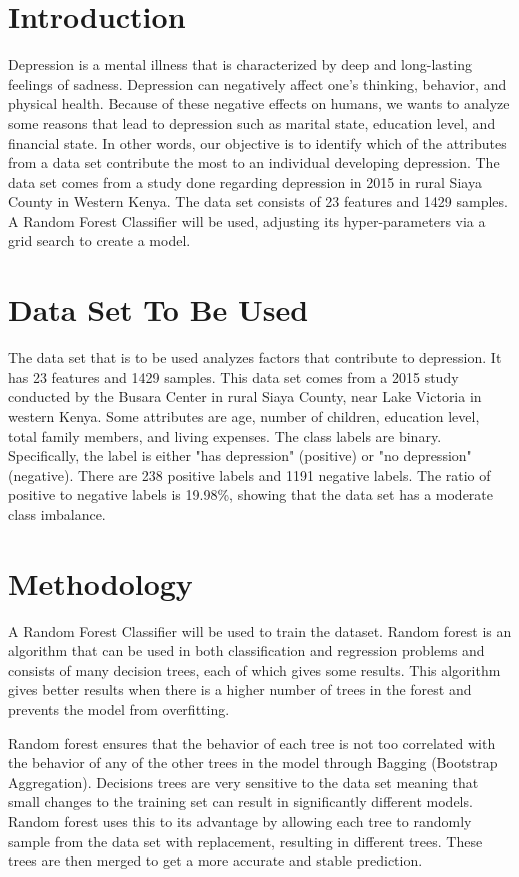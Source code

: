 \documentclass[conference]{IEEEtran}
\begin{document}
\section{Introduction}
Depression is a mental illness that is characterized by deep and long-lasting feelings of sadness. Depression can negatively affect one's thinking, behavior, and physical health. Because of these negative effects on humans, we wants to analyze some reasons that lead to depression such as marital state, education level, and financial state. In other words, our objective is to identify which of the attributes from a data set contribute the most to an individual developing depression. The data set comes from a study done regarding depression in 2015 in rural Siaya County in Western Kenya. The data set consists of 23 features and 1429 samples. A Random Forest Classifier will be used, adjusting its hyper-parameters via a grid search to create a model.

\section{Data Set To Be Used}
The data set that is to be used analyzes factors that contribute to depression. It has 23 features and 1429 samples. This data set comes from a 2015 study conducted by the Busara Center in rural Siaya County, near Lake Victoria in western Kenya. Some attributes are age, number of children, education level, total family members, and living expenses. The class labels are binary. Specifically, the label is either "has depression" (positive) or "no depression" (negative). There are 238 positive labels and 1191 negative labels. The ratio of positive to negative labels is 19.98\%, showing that the data set has a moderate class imbalance.


\section{Methodology}
A Random Forest Classifier will be used to train the dataset. Random forest is an algorithm that can be used in both classification and regression problems and consists of many decision trees, each of which gives some results. This algorithm gives better results when there is a higher number of trees in the forest and prevents the model from overfitting.  

Random forest ensures that the behavior of each tree is not too correlated with the behavior of any of the other trees in the model through Bagging (Bootstrap Aggregation). Decisions trees are very sensitive to the data set meaning that small changes to the training set can result in significantly different models. Random forest uses this to its advantage by allowing each tree to randomly sample from the data set with replacement, resulting in different trees. These trees are then merged to get a more accurate and stable prediction.
\end{document}
